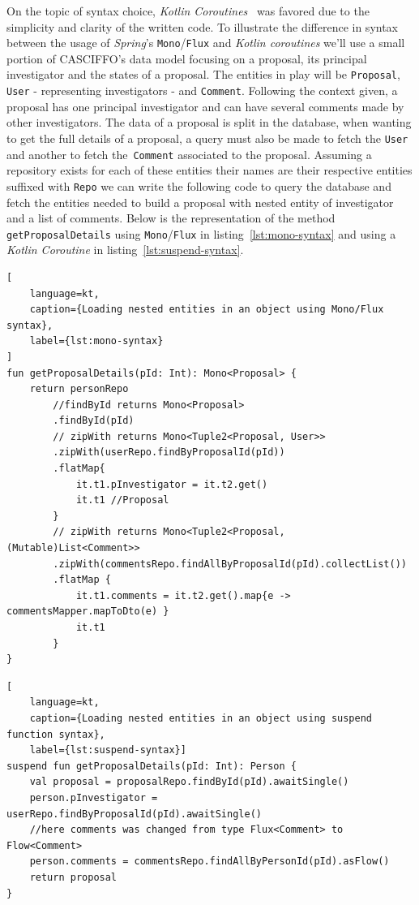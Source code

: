 On the topic of syntax choice, \textit{Kotlin Coroutines}~\cite{kotlin-coroutines} was favored due to the simplicity and clarity of the written code.
To illustrate the difference in syntax between the usage of \textit{Spring}'s \texttt{Mono}/\texttt{Flux} and \textit{Kotlin coroutines} we'll use a small portion of CASCIFFO's data model focusing on a proposal, its principal investigator and the states of a proposal. The entities in play will be \texttt{Proposal}, \texttt{User} - representing investigators - and \texttt{Comment}. Following the context given, a proposal has one principal investigator and can have several comments made by other investigators. The data of a proposal is split in the database, when wanting to get the full details of a proposal, a query must also be made to fetch the \texttt{User} and another to fetch the~\texttt{Comment} associated to the proposal. Assuming a repository exists for each of these entities their names are their respective entities suffixed with \texttt{Repo} we can write the following code to query the database and fetch the entities needed to build a proposal with nested entity of investigator and a list of comments.
Below is the representation of the method \texttt{getProposalDetails} using \texttt{Mono}/\texttt{Flux} in listing~\ref{lst:mono-syntax} and using a \textit{Kotlin Coroutine} in listing~\ref{lst:suspend-syntax}.

\begin{lstlisting}[
    language=kt, 
    caption={Loading nested entities in an object using Mono/Flux syntax}, 
    label={lst:mono-syntax}
]
fun getProposalDetails(pId: Int): Mono<Proposal> {
    return personRepo
        //findById returns Mono<Proposal>
        .findById(pId) 
        // zipWith returns Mono<Tuple2<Proposal, User>>
        .zipWith(userRepo.findByProposalId(pId)) 
        .flatMap{ 
            it.t1.pInvestigator = it.t2.get()
            it.t1 //Proposal
        }
        // zipWith returns Mono<Tuple2<Proposal, (Mutable)List<Comment>>
        .zipWith(commentsRepo.findAllByProposalId(pId).collectList()) 
        .flatMap {
            it.t1.comments = it.t2.get().map{e ->  commentsMapper.mapToDto(e) }
            it.t1
        }
}    
\end{lstlisting}


\begin{lstlisting}[
    language=kt, 
    caption={Loading nested entities in an object using suspend function syntax},
    label={lst:suspend-syntax}]
suspend fun getProposalDetails(pId: Int): Person {
    val proposal = proposalRepo.findById(pId).awaitSingle()
    person.pInvestigator = userRepo.findByProposalId(pId).awaitSingle()
    //here comments was changed from type Flux<Comment> to Flow<Comment>
    person.comments = commentsRepo.findAllByPersonId(pId).asFlow()
    return proposal
}    
\end{lstlisting}


